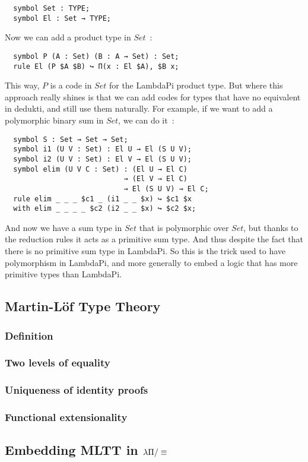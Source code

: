 \begin{lstlisting}
  symbol Set : TYPE;
  symbol El : Set → TYPE;
\end{lstlisting}

Now we can add a product type in $Set$~:

\begin{lstlisting}
  symbol P (A : Set) (B : A → Set) : Set;
  rule El (P $A $B) ↪ Π(x : El $A), $B x;
\end{lstlisting}

This way, $P$ is a code in $Set$ for the LambdaPi product type. But where this
approach really shines is that we can add codes for types that have no
equivalent in dedukti, and still use them naturally. For example, if we want to
add a polymorphic binary sum in $Set$, we can do it~:

\begin{lstlisting}
  symbol S : Set → Set → Set;
  symbol i1 (U V : Set) : El U → El (S U V);
  symbol i2 (U V : Set) : El V → El (S U V);
  symbol elim (U V C : Set) : (El U → El C)
                            → (El V → El C)
                            → El (S U V) → El C;
  rule elim _ _ _ $c1 _ (i1 _ _ $x) ↪ $c1 $x
  with elim _ _ _ _ $c2 (i2 _ _ $x) ↪ $c2 $x;
\end{lstlisting}

And now we have a sum type in $Set$ that is polymorphic over $Set$, but thanks
to the reduction rules it acts as a primitive sum type. And thus despite the
fact that there is no primitive sum type in LambdaPi. So this is the trick used
to have polymorphism in LambdaPi, and more generally to embed a logic that has
more primitive types than LambdaPi.

\subsection{Martin-Löf Type Theory}

\subsubsection{Definition}

\subsubsection{Two levels of equality}

\subsubsection{Uniqueness of identity proofs}

\subsubsection{Functional extensionality}

\subsection{Embedding MLTT in $\lambda\Pi/\equiv$}
